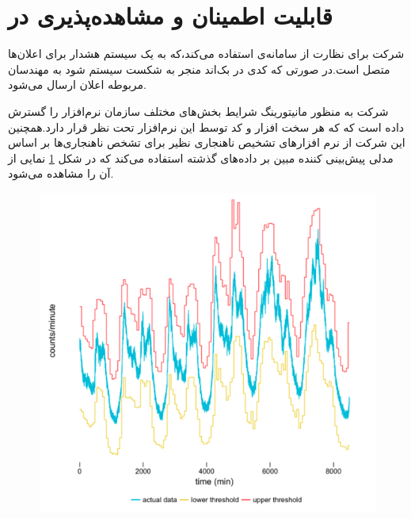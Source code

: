 \section{قابلیت اطمینان و مشاهده‌پذیری در }
شرکت  برای نظارت از سامانه‌ی \cite{Nagios} استفاده می‌کند،که به یک سیستم هشدار برای اعلان‌ها متصل است.در صورتی که کدی در بک‌اند منجر به شکست سیستم شود به مهندسان مربوطه اعلان ارسال می‌شود.

شرکت  به منظور مانیتورینگ شرایط بخش‌های مختلف سازمان نرم‌افزار \cite{m3} را گسترش داده است که که هر سخت افزار و کد توسط این نرم‌افزار تحت نظر قرار دارد.همچنین این شرکت از نرم افزار‌های تشخیص ناهنجاری نظیر \cite{argos} برای تشخص ناهنجاری‌ها بر اساس مدلی پیش‌بینی کننده مبین بر داده‌های گذشته استفاده می‌کند که در شکل \ref{fig:argos} نمایی از آن را مشاهده می‌شود.

\begin{figure}[h]
\centering
\includegraphics[scale=0.5]{argos.png}
\caption{}
\label{fig:argos}
\end{figure}








